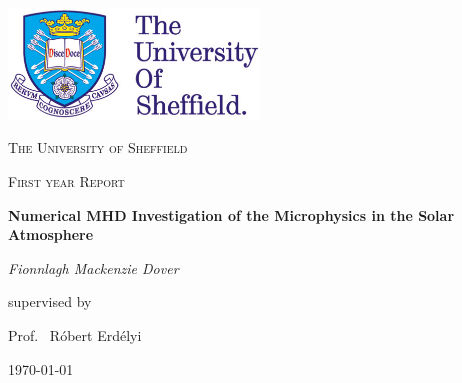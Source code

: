 \documentclass[12pt,a4paper,twoside]{article}
\begin{document}
\begin{titlepage}
	\centering
	\includegraphics[width=0.5\textwidth]{logo_uni2.jpg}\par\vspace{1cm}
	{\scshape\LARGE The University of Sheffield \par}
	\vspace{1cm}
	{\scshape\Large First year Report\par}
	\vspace{1.5cm}
	{\Large\bfseries Numerical MHD Investigation of the Microphysics in the Solar Atmosphere\par}
	\vspace{2cm}
	{\Large\itshape Fionnlagh Mackenzie Dover\par}
	\vfill
	\large supervised by\par
	\Large Prof.~ R\'{o}bert Erd\'{e}lyi

	\vfill

	{\large \today\par}
\end{titlepage}
\setcounter{page}{0}
\end{document}
